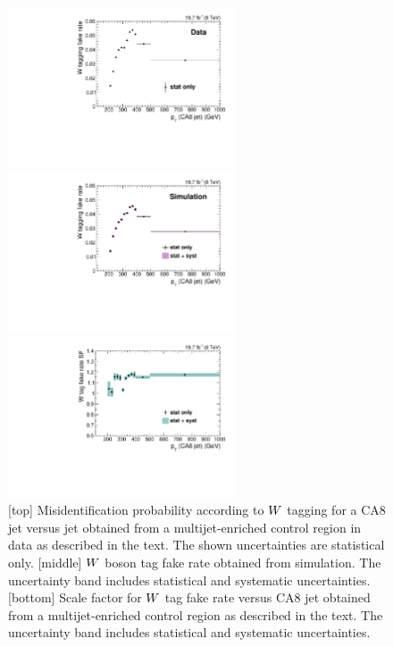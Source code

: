 \begin{figure}[htbp]
\centering
\includegraphics[width=0.6\textwidth]{figures/razor_wtag/Eff_Data_ratio_pt_tagged_all_Data_Thesis}

\includegraphics[width=0.6\textwidth]{figures/razor_wtag/Eff_MC_ratio_pt_tagged_all_MC_Thesis}

\includegraphics[width=0.6\textwidth]{figures/razor_wtag/SF_Wfake_Thesis}
\caption{[top] Misidentification probability according to $W$ tagging for a CA8 jet versus
jet \pt obtained from a multijet-enriched control region in data as described in the text. The shown
uncertainties are statistical only. 
[middle] $W$ boson tag fake rate obtained from simulation. The uncertainty band includes
statistical and systematic uncertainties.
[bottom] Scale factor for $W$ tag fake rate versus CA8 jet \pt obtained from a
multijet-enriched control region as described in the text. The uncertainty band includes
statistical and systematic uncertainties.
\label{fig:boost_wfake}}
\end{figure}

